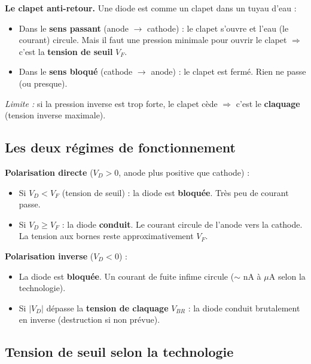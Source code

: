 \documentclass[12pt,a4paper,twoside]{book}
\begin{document}
\begin{analogie}
\textbf{Le clapet anti-retour.} Une diode est comme un clapet dans un tuyau d'eau :
\begin{itemize}[nosep]
\item Dans le \textbf{sens passant} (anode $\to$ cathode) : le clapet s'ouvre et l'eau (le courant) circule. Mais il faut une pression minimale pour ouvrir le clapet $\Rightarrow$ c'est la \textbf{tension de seuil} $V_F$.
\item Dans le \textbf{sens bloqué} (cathode $\to$ anode) : le clapet est fermé. Rien ne passe (ou presque).
\end{itemize}
\textit{Limite :} si la pression inverse est trop forte, le clapet cède $\Rightarrow$ c'est le \textbf{claquage} (tension inverse maximale).
\end{analogie}

\subsection{Les deux régimes de fonctionnement}

\begin{formule}
\textbf{Polarisation directe} ($V_D > 0$, anode plus positive que cathode) :
\begin{itemize}[nosep]
\item Si $V_D < V_F$ (tension de seuil) : la diode est \textbf{bloquée}. Très peu de courant passe.
\item Si $V_D \geq V_F$ : la diode \textbf{conduit}. Le courant circule de l'anode vers la cathode. La tension aux bornes reste approximativement $V_F$.
\end{itemize}

\textbf{Polarisation inverse} ($V_D < 0$) :
\begin{itemize}[nosep]
\item La diode est \textbf{bloquée}. Un courant de fuite infime circule ($\sim$ nA à $\mu$A selon la technologie).
\item Si $|V_D|$ dépasse la \textbf{tension de claquage} $V_{BR}$ : la diode conduit brutalement en inverse (destruction si non prévue).
\end{itemize}
\end{formule}

\subsection{Tension de seuil selon la technologie}
\end{document}
